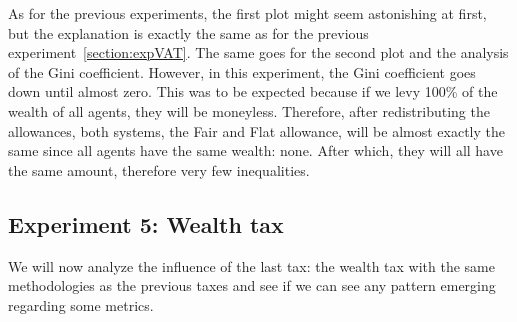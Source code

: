 {{        As for the previous experiments, the first plot might seem astonishing at first, but the explanation is exactly the same as for the previous experiment~\ref{section:expVAT}. The same goes for the second plot and the analysis of the Gini coefficient. However, in this experiment, the Gini coefficient goes down until almost zero. This was to be expected because if we levy 100\% of the wealth of all agents, they will be moneyless. Therefore, after redistributing the allowances, both systems, the Fair and Flat allowance, will be almost exactly the same since all agents have the same wealth: none. After which, they will all have the same amount, therefore very few inequalities.

    \subsection{Experiment 5: Wealth tax}
    We will now analyze the influence of the last tax: the wealth tax with the same methodologies as the previous taxes and see if we can see any pattern emerging regarding some metrics. 

}}
